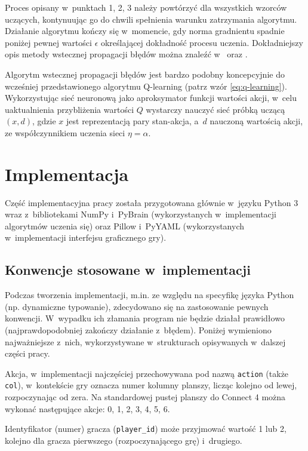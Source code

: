 \documentclass[a4paper, 12pt, oneside]{report}
\begin{document}
Proces opisany w~punktach 1, 2, 3 należy powtórzyć dla wszystkich wzorców uczących, kontynuując go do chwili spełnienia warunku zatrzymania algorytmu. Działanie algorytmu kończy się w~momencie, gdy norma gradnientu spadnie poniżej pewnej wartości $\epsilon$ określającej dokładność procesu uczenia. Dokładniejszy opis metody wstecznej propagacji błędów można znaleźć w~\cite{Flasinski11} oraz \cite{Osowski96}.

Algorytm wstecznej propagacji błędów jest bardzo podobny koncepcyjnie do wcześniej przedstawionego algorytmu Q-learning (patrz wzór \ref{eq:q-learning}). Wykorzystując sieć neuronową jako aproksymator funkcji wartości akcji, w~celu uaktualnienia przybliżenia wartości $Q$ wystarczy nauczyć sieć próbką uczącą $(x,d)$, gdzie $x$ jest reprezentacją pary stan-akcja, a~$d$ nauczoną wartością akcji, ze współczynnikiem uczenia sieci $\eta = \alpha$.

\chapter{Implementacja}
\label{chap:implementacja}

Część implementacyjna pracy została przygotowana głównie w~języku Python 3 wraz z~bibliotekami NumPy i~PyBrain (wykorzystanych w~implementacji algorytmów uczenia się) oraz Pillow i~PyYAML (wykorzystanych w~implementacji interfejsu graficznego gry).

\section{Konwencje stosowane w~implementacji}

Podczas tworzenia implementacji, m.in. ze względu na specyfikę języka Python (np. dynamiczne typowanie), zdecydowano się na zastosowanie pewnych konwencji. W~wypadku ich złamania program nie będzie działał prawidłowo (najprawdopodobniej zakończy działanie z~błędem). Poniżej wymieniono najważniejsze z~nich, wykorzystywane w~strukturach opisywanych w~dalszej części pracy.

Akcja, w~implementacji najczęściej przechowywana pod nazwą \texttt{action} (także \texttt{col}), w~kontekście gry oznacza numer kolumny planszy, licząc kolejno od lewej, rozpoczynając od zera. Na standardowej pustej planszy do Connect 4 można wykonać następujące akcje: 0, 1, 2, 3, 4, 5, 6.

Identyfikator (numer) gracza (\texttt{player\_id}) może przyjmować wartość 1 lub 2, kolejno dla gracza pierwszego (rozpoczynającego grę) i~drugiego.
\end{document}
